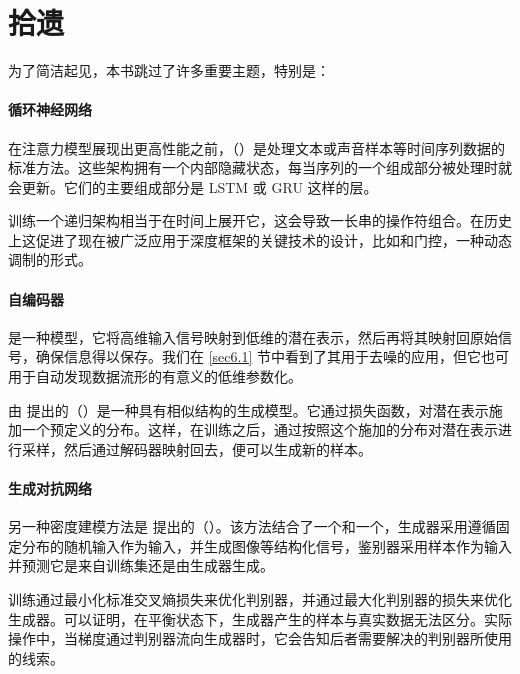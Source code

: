 
\chapter*{拾遗}

为了简洁起见，本书跳过了许多重要主题，特别是：

\subsubsection*{循环神经网络}

在注意力模型展现出更高性能之前，（）是处理文本或声音样本等时间序列数据的标准方法。这些架构拥有一个内部隐藏状态，每当序列的一个组成部分被处理时就会更新。它们的主要组成部分是 LSTM \citep{lstm} 或 GRU \citep{arxiv-1406.1078} 这样的层。

训练一个递归架构相当于在时间上展开它，这会导致一长串的操作符组合。在历史上这促进了现在被广泛应用于深度框架的关键技术的设计，比如和门控，一种动态调制的形式。

\subsubsection*{自编码器}

是一种模型，它将高维输入信号映射到低维的潜在表示，然后再将其映射回原始信号，确保信息得以保存。我们在 \ref{sec6.1} 节中看到了其用于去噪的应用，但它也可用于自动发现数据流形的有意义的低维参数化。

由 \cite{arxiv-1312.6114} 提出的（）是一种具有相似结构的生成模型。它通过损失函数，对潜在表示施加一个预定义的分布。这样，在训练之后，通过按照这个施加的分布对潜在表示进行采样，然后通过解码器映射回去，便可以生成新的样本。

\subsubsection*{生成对抗网络}

另一种密度建模方法是 \cite{arxiv-1406.2661} 提出的（）。该方法结合了一个和一个，生成器采用遵循固定分布的随机输入作为输入，并生成图像等结构化信号，鉴别器采用样本作为输入并预测它是来自训练集还是由生成器生成。

训练通过最小化标准交叉熵损失来优化判别器，并通过最大化判别器的损失来优化生成器。可以证明，在平衡状态下，生成器产生的样本与真实数据无法区分。实际操作中，当梯度通过判别器流向生成器时，它会告知后者需要解决的判别器所使用的线索。

